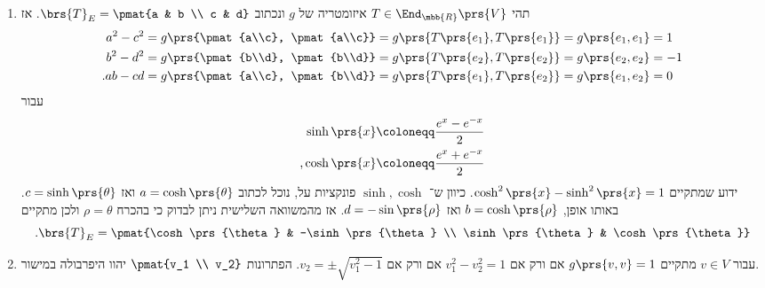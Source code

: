 \documentclass[a4paper,10pt,twoside,openany]{book}
\begin{document}
\begin{solution}
\begin{enumerate}
    \item
    תהי
    $T \in \End_{\mbb{R}}\prs{V}$
    איזומטריה של
    $g$
    ונכתוב
    $\brs{T}_E = \pmat{a & b \\ c & d}$.
    אז
    \begin{align*}
        a^2 - c^2 &= g\prs{\pmat{a\\c}, \pmat{a\\c}} = g\prs{T\prs{e_1}, T\prs{e_1}} = g\prs{e_1, e_1} = 1 \\
        b^2 - d^2 &= g\prs{\pmat{b\\d}, \pmat{b\\d}} = g\prs{T\prs{e_2}, T\prs{e_2}} = g\prs{e_2, e_2} = -1 \\
        \text{.} ab - cd &= g\prs{\pmat{a\\c}, \pmat{b\\d}} = g\prs{T\prs{e_1}, T\prs{e_2}} = g\prs{e_1, e_2} = 0
    \end{align*}
    עבור
    \begin{align*}
        \sinh\prs{x} \coloneqq \frac{e^x - e^{-x}}{2} \\
        \text{,}\cosh\prs{x} \coloneqq \frac{e^x + e^{-x}}{2}
    \end{align*}
    ידוע שמתקיים
    $\cosh^2\prs{x} - \sinh^2\prs{x} = 1$.
    כיוון ש־%
    $\sinh, \cosh$
    פונקציות על, נוכל לכתוב
    $a = \cosh\prs{\theta}$
    ואז
    $c = \sinh\prs{\theta}$.
    באותו אופן,
    $b = \cosh\prs{\rho}$
    ואז
    $d = -\sin\prs{\rho}$.
    אז מהמשוואה השלישית ניתן לבדוק כי בהכרח
    $\rho = \theta$
    ולכן מתקיים
    \[\text{.} \brs{T}_E = \pmat{\cosh\prs{\theta} & -\sinh\prs{\theta} \\ \sinh\prs{\theta} & \cosh\prs{\theta}}\]
    
    \item עבור
    $v \in V$
    מתקיים
    $g\prs{v,v} = 1$
    אם ורק אם
    $v_1^2 - v_2^2 = 1$
    אם ורק אם
    $v_2 = \pm \sqrt{v_1^2 - 1}$.
    הפתרונות
    $\pmat{v_1 \\ v_2}$
    יהוו היפרבולה במישור.
\end{enumerate}
\end{solution}

\pagebreak
\end{document}
